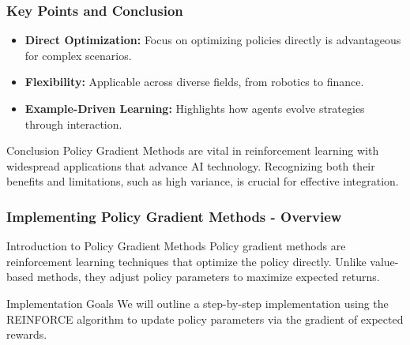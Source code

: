 \documentclass[aspectratio=169]{beamer}
\begin{document}
\begin{frame}[fragile]
    \frametitle{Key Points and Conclusion}
    \begin{itemize}
        \item \textbf{Direct Optimization:} Focus on optimizing policies directly is advantageous for complex scenarios.
        \item \textbf{Flexibility:} Applicable across diverse fields, from robotics to finance.
        \item \textbf{Example-Driven Learning:} Highlights how agents evolve strategies through interaction.
    \end{itemize}
    \begin{block}{Conclusion}
        Policy Gradient Methods are vital in reinforcement learning with widespread applications that advance AI technology. Recognizing both their benefits and limitations, such as high variance, is crucial for effective integration.
    \end{block}
\end{frame}

\begin{frame}[fragile]
    \frametitle{Implementing Policy Gradient Methods - Overview}
    \begin{block}{Introduction to Policy Gradient Methods}
        Policy gradient methods are reinforcement learning techniques that optimize the policy directly. 
        Unlike value-based methods, they adjust policy parameters to maximize expected returns.
    \end{block}
    
    \begin{block}{Implementation Goals}
        We will outline a step-by-step implementation using the REINFORCE algorithm to update policy parameters via the gradient of expected rewards.
    \end{block}
\end{frame}
\end{document}
